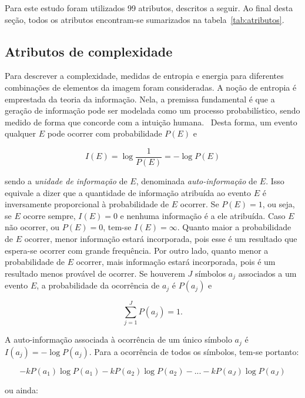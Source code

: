 Para este estudo foram utilizados 99 atributos, descritos a seguir. Ao
final desta seção, todos os atributos encontram-se sumarizados na
tabela~\ref{tab:atributos}.

\subsection{Atributos de complexidade}

Para descrever a complexidade, medidas de entropia e energia para
diferentes combinações de elementos da imagem foram consideradas. A
noção de entropia é emprestada da teoria da informação. Nela, a
premissa fundamental é que a geração de informação pode ser modelada
como um processo probabilístico, sendo medido de forma que concorde
com a intuição humana.~\cite{gonzalez} Desta forma, um evento qualquer
$E$ pode ocorrer com probabilidade $P(E)$ e

\begin{equation}
  I(E) = \log\frac{1}{P(E)} = -\log P(E)
\end{equation}

\noindent sendo a \emph{unidade de informação} de $E$, denominada
\emph{auto-informação} de $E$. Isso equivale a dizer que a quantidade
de informação atribuída ao evento $E$ é inversamente proporcional à
probabilidade de $E$ ocorrer. Se $P(E) = 1$, ou seja, se $E$ ocorre
sempre, $I(E) = 0$ e nenhuma informação é a ele atribuída. Caso $E$
não ocorrer, ou $P(E) = 0$, tem-se $I(E) = \infty$. Quanto maior a
probabilidade de $E$ ocorrer, menor informação estará incorporada,
pois esse é um resultado que espera-se ocorrer com grande
frequência. Por outro lado, quanto menor a probabilidade de $E$
ocorrer, mais informação estará incorporada, pois é um resultado menos
provável de ocorrer. Se houverem $J$ símbolos $a_j$ associados a um
evento $E$, a probabilidade da ocorrência de $a_j$ é $P(a_j)$ e

\begin{equation}
  \sum_{j=1}^J P(a_j) = 1.
\end{equation}

\noindent A auto-informação associada à ocorrência de um único símbolo
$a_j$ é $I(a_j) = -\log P(a_j)$. Para a ocorrência de todos os
símbolos, tem-se portanto:

\begin{equation}
  -kP(a_1) \log P(a_1) -kP(a_2) \log P(a_2) -...-kP(a_J) \log P(a_J)
\end{equation}

\noindent ou ainda:

